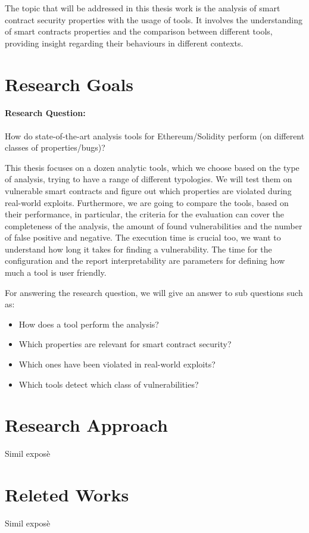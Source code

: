The topic that will be addressed in this thesis work is the analysis of smart contract security properties with the usage of tools. 
It involves the understanding of smart contracts properties and the comparison between different tools, 
providing insight regarding their behaviours in different contexts.


\section{Research Goals}
\label{sec:Introduction:ResearchGoals}
\paragraph{Research Question:} 
How do state-of-the-art analysis tools for Ethereum/Solidity perform (on different classes of properties/bugs)?

This thesis focuses on a dozen analytic tools, which we choose based on the type of analysis, trying to have a range of different typologies. 
We will test them on vulnerable smart contracts and figure out which properties are violated during real-world exploits. 
Furthermore, we are going to compare the tools, based on their performance, in particular, the criteria for the evaluation can cover the completeness of the analysis, the amount of found vulnerabilities and the number of false positive and negative. 
The execution time is crucial too, we want to understand how long it takes for finding a vulnerability. The time for the configuration and the report interpretability are parameters for defining how much a tool is user friendly. 

For answering the research question, we will give an answer to sub questions such as: 
\begin{itemize}
  \item How does a tool perform the analysis? 
  \item Which properties are relevant for smart contract security?
  \item Which ones have been violated in real-world exploits? 
  \item Which tools detect which class of vulnerabilities? 
\end{itemize}

\section{Research Approach}
\label{sec:Introduction:ResearchApproach}
Simil exposè

\section{Releted Works}
\label{sec:Introduction:ReletedWorks}
Simil exposè